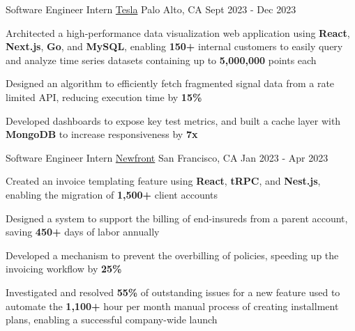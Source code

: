
\begin{cventries}
  \cventry
    {Software Engineer Intern} %
    {\href{https://www.tesla.com/}{Tesla}} %
    {Palo Alto, CA} %
    {Sept 2023 - Dec 2023} %
    {
      \begin{cvitems} %
      \item {Architected a high‑performance data visualization web application using \textbf{React}, \textbf{Next.js}, \textbf{Go}, and \textbf{MySQL}, enabling \textbf{150+} internal customers to easily query and analyze time series datasets containing up to \textbf{5,000,000} points each}
      \item {Designed an algorithm to efficiently fetch fragmented signal data from a rate limited API, reducing execution time by \textbf{15\%}}
      \item {Developed dashboards to expose key test metrics, and built a cache layer with \textbf{MongoDB} to increase responsiveness by \textbf{7x}}
      \end{cvitems}
    }

  \cventry
    {Software Engineer Intern} %
    {\href{https://www.newfront.com/}{Newfront}} %
    {San Francisco, CA} %
    {Jan 2023 - Apr 2023} %
    {
      \begin{cvitems} %
      \item {Created an invoice templating feature using \textbf{React}, \textbf{tRPC}, and \textbf{Nest.js}, enabling the migration of \textbf{1,500+} client accounts}
      \item {Designed a system to support the billing of end-insureds from a parent account, saving \textbf{450+} days of labor annually}
      \item {Developed a mechanism to prevent the overbilling of policies, speeding up the invoicing workflow by \textbf{25\%}}
      \item {Investigated and resolved \textbf{55\%} of outstanding issues for a new feature used to automate the \textbf{1,100+} hour per month manual process of creating installment plans, enabling a successful company-wide launch}
      \end{cvitems}
    }


\end{cventries}
